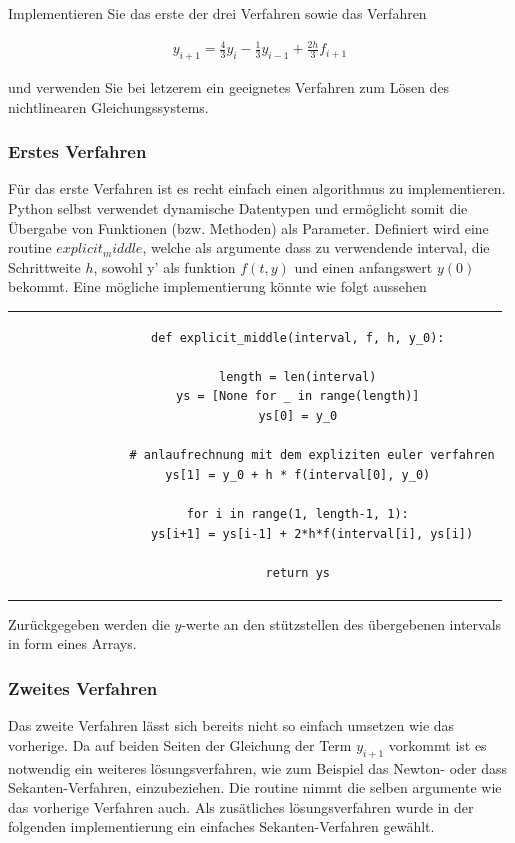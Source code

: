 \documentclass{article}
\newcommand\Section[1]{ %
  \addtocontents{toc}{\protect\setcounter{tocdepth}{0}}
  \subsubsection*{#1}
  \addtocontents{toc}{\protect\setcounter{tocdepth}{3}}}
\begin{document}
		Implementieren Sie das erste der drei Verfahren sowie das Verfahren
		
		\begin{align*}
			y_{i+1} = \frac{4}{3}y_{i} - \frac{1}{3}y_{i-1} + \frac{2h}{3}f_{i+1}
		\end{align*}
		
		und verwenden Sie bei letzerem ein geeignetes Verfahren zum Lösen des nichtlinearen Gleichungssystems.
		
		\Section{Erstes Verfahren}
		
			Für das erste Verfahren ist es recht einfach einen algorithmus zu implementieren. Python selbst verwendet dynamische Datentypen und ermöglicht somit 
			die Übergabe von Funktionen (bzw. Methoden) als Parameter. Definiert wird eine routine $explicit_middle$, welche als argumente dass zu verwendende interval, die Schrittweite $h$,
			sowohl y' als funktion $f(t, y)$ und einen anfangswert $y(0)$ bekommt. Eine mögliche implementierung könnte wie folgt aussehen
			\newline
			

			\begin{tabular}{c}
			\begin{lstlisting}
			def explicit_middle(interval, f, h, y_0):

    		length = len(interval)
    		ys = [None for _ in range(length)]
    		ys[0] = y_0

				# anlaufrechnung mit dem expliziten euler verfahren
    		ys[1] = y_0 + h * f(interval[0], y_0)

    		for i in range(1, length-1, 1):
        		ys[i+1] = ys[i-1] + 2*h*f(interval[i], ys[i])

    		return ys
			\end{lstlisting}
 			\end{tabular}	
 			\newline
 			
 			Zurückgegeben werden die $y$-werte an den stützstellen des übergebenen intervals in form eines Arrays.
 			
 		\Section{Zweites Verfahren}
 		
 			Das zweite Verfahren lässt sich bereits nicht so einfach umsetzen wie das vorherige. Da auf beiden Seiten der Gleichung der Term $y_{i+1}$ vorkommt ist es notwendig ein weiteres lösungsverfahren, wie zum
 			Beispiel das Newton- oder dass Sekanten-Verfahren, einzubeziehen. Die routine nimmt die selben argumente wie das vorherige Verfahren auch. Als zusätliches lösungsverfahren wurde in der folgenden implementierung ein einfaches Sekanten-Verfahren gewählt.	
 			\newline
 			
\end{document}
